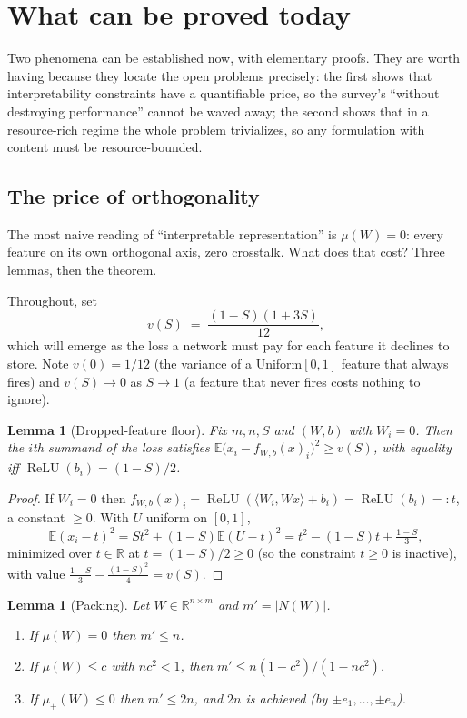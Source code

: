 \documentclass[11pt]{amsart}
\theoremstyle{plain}
\newtheorem{lemma}[theorem]{Lemma}
\theoremstyle{definition}
\DeclareMathOperator{\relu}{ReLU}
\newcommand{\E}{\mathbb{E}}
\newcommand{\R}{\mathbb{R}}
\begin{document}
\section{What can be proved today}\label{sec:proved}

Two phenomena can be established now, with elementary proofs. They are worth having because they locate the open problems precisely: the first shows that interpretability constraints have a quantifiable price, so the survey's ``without destroying performance'' cannot be waved away; the second shows that in a resource-rich regime the whole problem trivializes, so any formulation with content must be resource-bounded.

\subsection{The price of orthogonality}

The most naive reading of ``interpretable representation'' is $\mu(W)=0$: every feature on its own orthogonal axis, zero crosstalk. What does that cost? Three lemmas, then the theorem.

Throughout, set
\[
v(S) \;=\; \frac{(1-S)(1+3S)}{12},
\]
which will emerge as the loss a network must pay for each feature it declines to store. Note $v(0)=1/12$ (the variance of a Uniform$[0,1]$ feature that always fires) and $v(S)\to0$ as $S\to1$ (a feature that never fires costs nothing to ignore).

\begin{lemma}[Dropped-feature floor]\label{lem:floor}
Fix $m,n,S$ and $(W,b)$ with $W_i=0$. Then the $i$th summand of the loss satisfies
$\E\bigl(x_i - f_{W,b}(x)_i\bigr)^2 \ge v(S)$, with equality iff $\relu(b_i)=(1-S)/2$.
\end{lemma}

\begin{proof}
If $W_i=0$ then $f_{W,b}(x)_i=\relu(\langle W_i, Wx\rangle + b_i)=\relu(b_i)=:t$, a constant $\ge0$. With $U$ uniform on $[0,1]$,
\[
\E(x_i-t)^2 = S t^2 + (1-S)\E(U-t)^2 = t^2-(1-S)t+\tfrac{1-S}{3},
\]
minimized over $t\in\R$ at $t=(1-S)/2\ge0$ (so the constraint $t\ge0$ is inactive), with value $\tfrac{1-S}{3}-\tfrac{(1-S)^2}{4}=v(S)$.
\end{proof}

\begin{lemma}[Packing]\label{lem:packing}
Let $W\in\R^{n\times m}$ and $m'=|N(W)|$.
\begin{enumerate}
\item If $\mu(W)=0$ then $m'\le n$.
\item If $\mu(W)\le c$ with $nc^2<1$, then $m' \le n(1-c^2)/(1-nc^2)$.
\item If $\mu_+(W)\le 0$ then $m'\le 2n$, and $2n$ is achieved (by $\pm e_1,\dots,\pm e_n$).
\end{enumerate}
\end{lemma}
\end{document}
